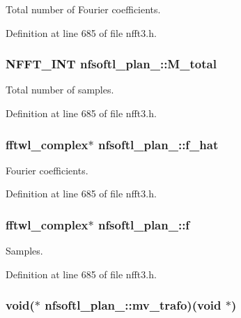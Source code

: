 Total number of Fourier coefficients. 



Definition at line 685 of file nfft3.\-h.

\hypertarget{structnfsoftl__plan___a376e6b85b55fc057e94823eef19e15b7}{
\subsubsection[{M\-\_\-total}]{\setlength{\rightskip}{0pt plus 5cm}N\-F\-F\-T\-\_\-\-I\-N\-T nfsoftl\-\_\-plan\-\_\-\-::\-M\-\_\-total}}\label{structnfsoftl__plan___a376e6b85b55fc057e94823eef19e15b7}


Total number of samples. 



Definition at line 685 of file nfft3.\-h.

\hypertarget{structnfsoftl__plan___ab280522456fe4f49ccb91d4aa195702d}{
\subsubsection[{f\-\_\-hat}]{\setlength{\rightskip}{0pt plus 5cm}fftwl\-\_\-complex$\ast$ nfsoftl\-\_\-plan\-\_\-\-::f\-\_\-hat}}\label{structnfsoftl__plan___ab280522456fe4f49ccb91d4aa195702d}


Fourier coefficients. 



Definition at line 685 of file nfft3.\-h.

\hypertarget{structnfsoftl__plan___a62073b403c90aa2b527d5f62f190112e}{
\subsubsection[{f}]{\setlength{\rightskip}{0pt plus 5cm}fftwl\-\_\-complex$\ast$ nfsoftl\-\_\-plan\-\_\-\-::f}}\label{structnfsoftl__plan___a62073b403c90aa2b527d5f62f190112e}


Samples. 



Definition at line 685 of file nfft3.\-h.

\hypertarget{structnfsoftl__plan___aeab94862046b7688470f3f1d78ca927d}{
\subsubsection[{mv\-\_\-trafo}]{\setlength{\rightskip}{0pt plus 5cm}void($\ast$ nfsoftl\-\_\-plan\-\_\-\-::mv\-\_\-trafo)(void $\ast$)}}\label{structnfsoftl__plan___aeab94862046b7688470f3f1d78ca927d}


